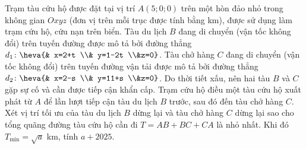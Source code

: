 \begin{bt}%
	Trạm tàu cứu hộ được đặt tại vị trí $A(5;0;0)$ trên một hòn đảo nhỏ  trong không gian $Oxyz$ (đơn vị trên mỗi trục được tính bằng km), được sử dụng làm trạm cứu hộ, cứu nạn trên biển. Tàu du lịch $B$ đang di chuyển (vận tốc không đổi) trên tuyến đường được mô tả bởi đường thẳng $d_1\colon \heva{& x=2+t \\& y=1-2t \\&z=0}$. Tàu chở hàng $C$ đang di chuyển (vận tốc không đổi) trên tuyến đường vận tải được mô tả bởi đường thẳng $d_2\colon \heva{& x=2-s \\& y=11+s \\&z=0}$. Do thời tiết xấu, nên hai tàu $B$ và $C$ gặp sự cố và cần được tiếp cận khẩn cấp. Trạm cứu hộ điều một tàu cứu hộ xuất phát từ $A$ để lần lượt tiếp cận tàu du lịch $B$ trước, sau đó đến tàu chở hàng $C$. Xét vị trí tối ưu của tàu du lịch $B$ dừng lại và tàu chở hàng $C$ dừng lại sao cho tổng quãng đường tàu cứu hộ cần đi $T=AB+BC+CA$ là nhỏ nhất. Khi đó $T_{\min\limits}=\sqrt{a}$ km, tính $a+2025$.
\end{bt}
